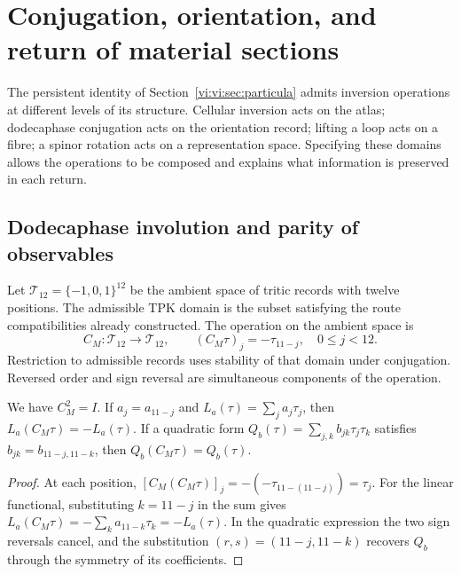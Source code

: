 \section{Conjugation, orientation, and return of material sections}
\label{vi:vi:sec:conjugacion}

The persistent identity of Section~\ref{vi:vi:sec:particula} admits
inversion operations at different levels of its structure.
Cellular inversion acts on the atlas; dodecaphase conjugation
acts on the orientation record; lifting a loop acts
on a fibre; a spinor rotation acts on a representation
space. Specifying these domains allows the operations to be
composed and explains what information is preserved in each return.

\subsection{Dodecaphase involution and parity of observables}
\label{vi:vi:subsec:conjugacion-registro}

Let $\mathcal T_{12}=\{-1,0,1\}^{12}$ be the ambient space of tritic
records with twelve positions. The admissible TPK domain is the
subset satisfying the route compatibilities already constructed. The
operation on the ambient space is
\begin{equation}
 C_M:\mathcal T_{12}\longrightarrow\mathcal T_{12},\qquad
 (C_M\tau)_j=-\tau_{11-j},\quad 0\leq j<12.
 \label{vi:vi:eq:cm}
\end{equation}
Restriction to admissible records uses stability of that
domain under conjugation. Reversed order and sign reversal
are simultaneous components of the operation.

\begin{proposition}
\label{vi:vi:prop:paridad-registro}
We have $C_M^2=I$. If $a_j=a_{11-j}$ and
$L_a(\tau)=\sum_ja_j\tau_j$, then
$L_a(C_M\tau)=-L_a(\tau)$. If a quadratic form
$Q_b(\tau)=\sum_{j,k}b_{jk}\tau_j\tau_k$ satisfies
$b_{jk}=b_{11-j,11-k}$, then $Q_b(C_M\tau)=Q_b(\tau)$.
\end{proposition}
\begin{proof}
At each position,
$[C_M(C_M\tau)]_j=-(-\tau_{11-(11-j)})=\tau_j$.
For the linear functional, substituting $k=11-j$ in the sum gives
$L_a(C_M\tau)=-\sum_ka_{11-k}\tau_k=-L_a(\tau)$.
In the quadratic expression the two sign reversals cancel, and
the substitution $(r,s)=(11-j,11-k)$ recovers $Q_b$ through the
symmetry of its coefficients.
\end{proof}

